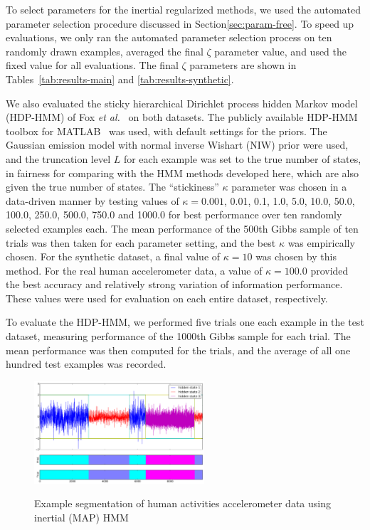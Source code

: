 \documentclass[letterpaper]{article}
\begin{document}
To select parameters for the inertial regularized methods, we used the automated
parameter selection procedure discussed in Section\ref{sec:param-free}. To speed
up evaluations, we only ran the automated parameter selection process on ten
randomly drawn examples, averaged the final $\zeta$ parameter value, and used
the fixed value for all evaluations. The final $\zeta$ parameters are shown in
Tables~\ref{tab:results-main} and \ref{tab:results-synthetic}.

We also evaluated the sticky hierarchical Dirichlet process hidden Markov model
(HDP-HMM) of Fox \emph{et al.}~\cite{fox2011sticky} on both datasets. The
publicly available HDP-HMM toolbox for MATLAB~\cite{HDP-HMM-TOOLKIT} was used,
with default settings for the priors. The Gaussian emission model with normal
inverse Wishart (NIW) prior were used, and the truncation level $L$ for each
example was set to the true number of states, in fairness for comparing with the
HMM methods developed here, which are also given the true number of states. The
``stickiness'' $\kappa$ parameter was chosen in a data-driven manner by testing
values of $\kappa=0.001$, 0.01, 0.1, 1.0, 5.0, 10.0, 50.0, 100.0, 250.0, 500.0,
750.0 and 1000.0 for best performance over ten randomly selected examples each.
The mean performance of the 500th Gibbs sample of ten trials was then taken for
each parameter setting, and the best $\kappa$ was empirically chosen. For the
synthetic dataset, a final value of $\kappa=10$ was chosen by this method. For
the real human accelerometer data, a value of $\kappa=100.0$ provided the best
accuracy and relatively strong variation of information performance. These
values were used for evaluation on each entire dataset, respectively.

To evaluate the HDP-HMM, we performed five trials one each example in the test
dataset, measuring performance of the 1000th Gibbs sample for each trial. The
mean performance was then computed for the trials, and the average of all one
hundred test examples was recorded.
\begin{figure}[htbp]
  \centering
    \includegraphics[width=0.8\linewidth,
    height=1.5in]{images/MAP_PARAM_FREE_results_hard_activity_long_1,97_3_states.pdf}
    \label{fig:real-results-MAP}
    \caption{\small{Example segmentation of human activities accelerometer data
    using inertial (MAP) HMM}}
\end{figure}
\end{document}
